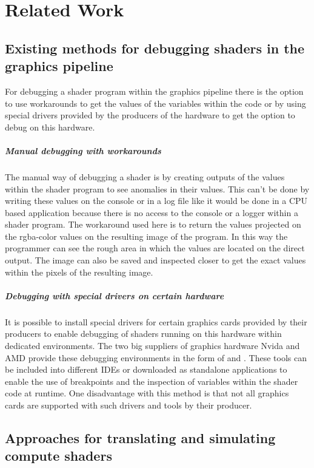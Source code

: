 
\chapter{Related Work}\label{cha:RelatedWork}
\section{Existing methods for debugging shaders in the graphics pipeline}
\label{section:debuggingMethods}

For debugging a shader program within the graphics pipeline there is the option to use workarounds to get the values of the variables within the code or by using special drivers provided by the producers of the hardware to get the option to debug on this hardware.

\paragraph{Manual debugging with workarounds}

The manual way of debugging a shader is by creating outputs of the values within the shader program to see anomalies in their values. This can't be done by writing these values on the console or in a log file like it would be done in a CPU based application because there is no access to the console or a logger within a shader program. The workaround used here is to return the values projected on the rgba-color values on the resulting image of the program. In this way the programmer can see the rough area in which the values are located on the direct output. The image can also be saved and inspected closer to get the exact values within the pixels of the resulting image.

\paragraph{Debugging with special drivers on certain hardware}
\label{section:debuggingMethods_drivers}

It is possible to install special drivers for certain graphics cards provided by their producers to enable debugging of shaders running on this hardware within dedicated environments. The two big suppliers of graphics hardware Nvida and AMD provide these debugging environments in the form of \cite{Nvidia_Nsight} and \cite{AMD_GPUPerfStudio}. These tools can be included into different IDEs or downloaded as standalone applications to enable the use of breakpoints and the inspection of variables within the shader code at runtime. One disadvantage with this method is that not all graphics cards are supported with such drivers and tools by their producer.

\section{Approaches for translating and simulating compute shaders}
\label{section:computeApproaches}